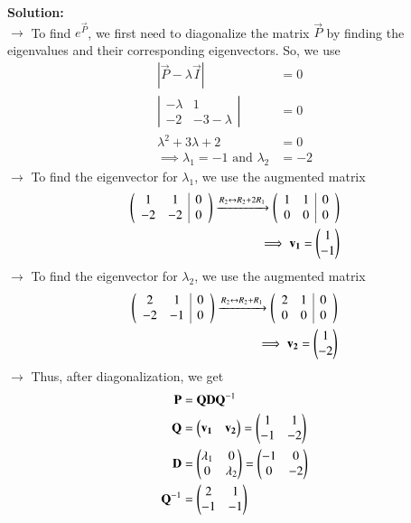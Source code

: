 \documentclass[journal]{IEEEtran}
\begin{document}
\textbf{Solution:}\\
$\rightarrow$ To find $e^{\vec{P}}$, we first need to diagonalize the matrix $\vec{P}$ by finding the eigenvalues and their corresponding eigenvectors. So, we use
\begin{align}
    |\vec{P} - \lambda\vec{I}| &= 0 \\
    \left|\begin{array}{cc}-\lambda&1\\-2&-3-\lambda\end{array}\right| &= 0 \\
    \lambda^2 + 3\lambda + 2 &= 0 \\
    \implies \lambda_1 = -1\text{ and }\lambda_2 &= -2
\end{align}
$\rightarrow$ To find the eigenvector for $\lambda_1$, we use the augmented matrix
\begin{align}
    \left(\begin{array}{cc|c}1&1&0\\-2&-2&0\end{array}\right) \xrightarrow{R_2 \leftrightarrow R_2 + 2R_1} \left(\begin{array}{cc|c}1&1&0\\0&0&0\end{array}\right) \\
    \implies \mathbf{v_1} = \begin{pmatrix}1\\-1\end{pmatrix}
\end{align}
$\rightarrow$ To find the eigenvector for $\lambda_2$, we use the augmented matrix
\begin{align}
    \left(\begin{array}{cc|c}2&1&0\\-2&-1&0\end{array}\right) \xrightarrow{R_2 \leftrightarrow R_2 + R_1} \left(\begin{array}{cc|c}2&1&0\\0&0&0\end{array}\right) \\
    \implies \mathbf{v_2} = \begin{pmatrix}1\\-2\end{pmatrix}
\end{align}
$\rightarrow$ Thus, after diagonalization, we get
\begin{align}
    \mathbf{P} &= \mathbf{Q}\mathbf{D}\mathbf{Q}^{-1} \\
    \mathbf{Q} &= \begin{pmatrix}\mathbf{v_1}&\mathbf{v_2}\end{pmatrix} = \begin{pmatrix}1&1\\-1&-2\end{pmatrix} \\
    \mathbf{D} &= \begin{pmatrix}\lambda_1&0\\0&\lambda_2\end{pmatrix} = \begin{pmatrix}-1&0\\0&-2\end{pmatrix} \\
    \mathbf{Q}^{-1} &= \begin{pmatrix}2&1\\-1&-1\end{pmatrix}
\end{align}
\end{document}
